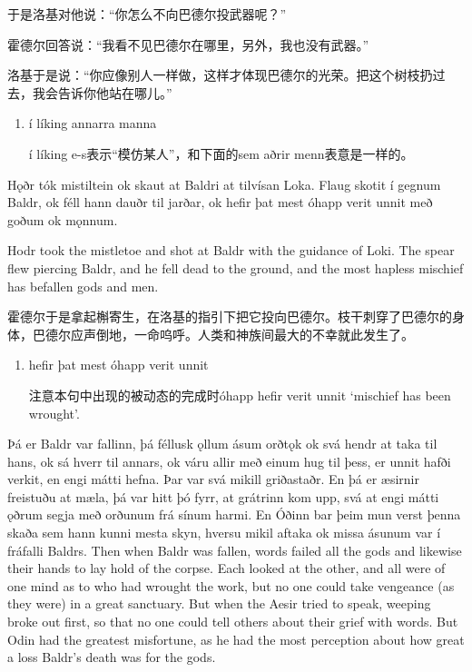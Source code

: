 \begin{translation*}{}
  于是洛基对他说：“你怎么不向巴德尔投武器呢？”

  霍德尔回答说：“我看不见巴德尔在哪里，另外，我也没有武器。”

  洛基于是说：“你应像别人一样做，这样才体现巴德尔的光荣。把这个树枝扔过去，我会告诉你他站在哪儿。”
\end{translation*}
\begin{grammar*}{}
  \begin{enumerate}[leftmargin=*]
    \item í líking annarra manna

          í líking e-s表示“模仿某人”，和下面的sem aðrir menn表意是一样的。
  \end{enumerate}
\end{grammar*}
\begin{paracol}{2}
  Hǫðr tók mistiltein ok skaut at Baldri at tilvísan Loka. Flaug skotit í gegnum Baldr, ok féll hann dauðr til jarðar, ok hefir þat mest óhapp verit unnit með goðum ok mǫnnum.

  \switchcolumn

  Hodr took the mistletoe and shot at Baldr with the guidance of Loki. The spear flew piercing Baldr, and he fell dead to the ground, and the most hapless mischief has befallen gods and men.
\end{paracol}
\begin{translation*}{}
  霍德尔于是拿起槲寄生，在洛基的指引下把它投向巴德尔。枝干刺穿了巴德尔的身体，巴德尔应声倒地，一命呜呼。人类和神族间最大的不幸就此发生了。
\end{translation*}
\begin{grammar*}{}
  \begin{enumerate}[leftmargin=*]
    \item hefir þat mest óhapp verit unnit

          注意本句中出现的被动态的完成时óhapp hefir verit unnit `mischief has been wrought'.
  \end{enumerate}
\end{grammar*}
\begin{paracol}{2}
  Þá er Baldr var fallinn, þá féllusk ǫllum ásum orðtǫk ok svá hendr at taka til hans, ok sá hverr til annars, ok váru allir með einum hug til þess, er unnit hafði verkit, en engi mátti hefna. Þar var svá mikill griðastaðr. En þá er æsirnir freistuðu at mæla, þá var hitt þó fyrr, at grátrinn kom upp, svá at engi mátti ǫðrum segja með orðunum frá sínum harmi. En Óðinn bar þeim mun verst þenna skaða sem hann kunni mesta skyn, hversu mikil aftaka ok missa ásunum var í fráfalli Baldrs.
  \switchcolumn
  Then when Baldr was fallen, words failed all the gods and likewise their hands to lay hold of the corpse. Each looked at the other, and all were of one mind as to who had wrought the work, but no one could take vengeance (as they were) in a great sanctuary. But when the Aesir tried to speak, weeping broke out first, so that no one could tell others about their grief with words. But Odin had the greatest misfortune, as he had the most perception about how great a loss Baldr's death was for the gods.
\end{paracol}
